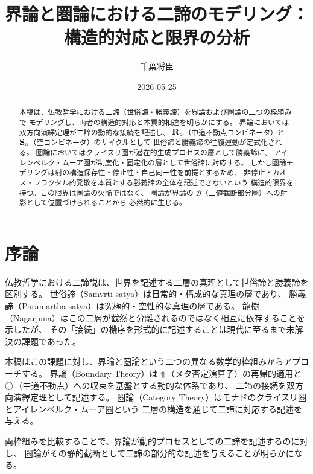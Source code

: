 \documentclass[11pt,a4paper]{ltjsarticle}
\theoremstyle{definition}
\begin{document}
\title{界論と圏論における二諦のモデリング：\\
構造的対応と限界の分析}
\author{千葉将臣}
\date{2026-05-25}
\maketitle

\begin{abstract}
本稿は、仏教哲学における二諦（世俗諦・勝義諦）を界論および圏論の二つの枠組みで
モデリングし、両者の構造的対応と本質的相違を明らかにする。
界論においては双方向演繹定理が二諦の動的な接続を記述し、
$\mathbf{R}_{\circ}$（中道不動点コンビネータ）と $\mathbf{S}_{\circ}$（空コンビネータ）のサイクルとして
世俗諦と勝義諦の往復運動が定式化される。
圏論においてはクライスリ圏が潜在的生成プロセスの層として勝義諦に、
アイレンベルク・ムーア圏が制度化・固定化の層として世俗諦に対応する。
しかし圏論モデリングは射の構造保存性・停止性・自己同一性を前提とするため、
非停止・カオス・フラクタル的発散を本質とする勝義諦の全体を記述できないという
構造的限界を持つ。この限界は圏論の欠陥ではなく、
圏論が界論の $\mathcal{B}$（二値截断部分圏）への射影として位置づけられることから
必然的に生じる。
\end{abstract}

\tableofcontents
\newpage

\section{序論}

仏教哲学における二諦説は、世界を記述する二層の真理として世俗諦と勝義諦を区別する。
世俗諦（Samvrti-satya）は日常的・構成的な真理の層であり、
勝義諦（Paramārtha-satya）は究極的・空性的な真理の層である。
龍樹（Nāgārjuna）はこの二層が截然と分離されるのではなく相互に依存することを示したが、
その「接続」の機序を形式的に記述することは現代に至るまで未解決の課題であった。

本稿はこの課題に対し、界論と圏論という二つの異なる数学的枠組みからアプローチする。
界論（Boundary Theory）は $\Uparrow$（メタ否定演算子）の再帰的適用と
$\bigcirc$（中道不動点）への収束を基盤とする動的な体系であり、
二諦の接続を双方向演繹定理として記述する。
圏論（Category Theory）はモナドのクライスリ圏とアイレンベルク・ムーア圏という
二層の構造を通じて二諦に対応する記述を与える。

両枠組みを比較することで、界論が動的プロセスとしての二諦を記述するのに対し、
圏論がその静的截断として二諦の部分的な記述を与えることが明らかになる。
\end{document}

